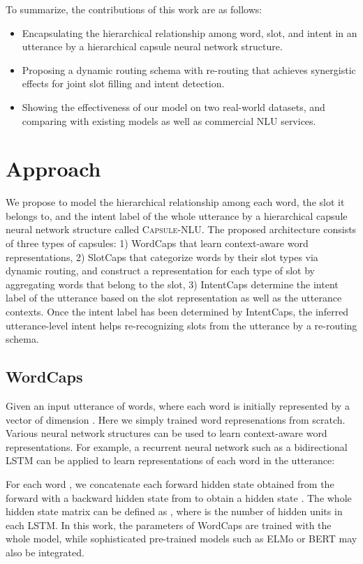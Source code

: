 \documentclass[11pt,a4paper,hyphens]{article}
\newcommand{\ModelName}{{\textsc{Capsule-NLU}}}
\newcommand{\FirstCapsule}{WordCaps}
\newcommand{\SecondCapsule}{SlotCaps}
\newcommand{\ThirdCapsule}{IntentCaps}
\begin{document}
To summarize, the contributions of this work are as follows:
\begin{itemize}
    \item Encapsulating the hierarchical relationship among word, slot, and intent in an utterance by a hierarchical capsule neural network structure.
    \item Proposing a dynamic routing schema with re-routing that achieves synergistic effects for joint slot filling and intent detection.
    \item Showing the effectiveness of our model on two real-world datasets, and comparing with existing models as well as commercial NLU services.
\end{itemize} \section{Approach}
We propose to model the hierarchical relationship among each word, the slot it belongs to, and the intent label of the whole utterance by a hierarchical capsule neural network structure called {\ModelName}. The proposed architecture consists of three types of capsules: 1) {\FirstCapsule} that learn context-aware word representations, 2) {\SecondCapsule} that categorize words by their slot types via dynamic routing, and construct a representation for each type of slot by aggregating words that belong to the slot, 3) {\ThirdCapsule} determine the intent label of the utterance based on the slot representation as well as the utterance contexts. Once the intent label has been determined by {\ThirdCapsule}, the inferred utterance-level intent helps re-recognizing slots from the utterance by a re-routing schema. 

\subsection{WordCaps}
Given an input utterance  of  words, where each word is initially represented by a vector of dimension . Here we simply trained word represenations from scratch. Various neural network structures can be used to learn context-aware word representations. For example, a recurrent neural network such as a bidirectional LSTM \citep{hochreiter1997long} can be applied to learn representations of each word in the utterance:

For each word , we concatenate each forward hidden state  obtained from the forward  with a backward hidden state  from  to obtain a hidden state . The whole hidden state matrix can be defined as , where  is the number of hidden units in each LSTM. 
In this work, the parameters of WordCaps are trained with the whole model, while sophisticated pre-trained models such as ELMo \citep{peters2018deep} or BERT \citep{devlin2018bert} may also be integrated.
 
\end{document}
